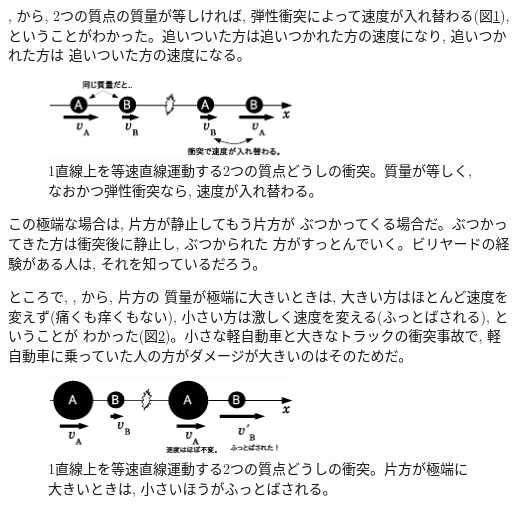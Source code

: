 , から, 
2つの質点の質量が等しければ, 弾性衝突によって速度が入れ替わる(図\ref{fig:collision24}), 
ということがわかった。追いついた方は追いつかれた方の速度になり, 追いつかれた方は
追いついた方の速度になる。
\begin{figure}[h]
    \centering
    \includegraphics[width=6.5cm]{collision24.eps}
    \caption{1直線上を等速直線運動する2つの質点どうしの衝突。質量が等しく, なおかつ弾性衝突なら, 速度が入れ替わる。}\label{fig:collision24}
\end{figure}
この極端な場合は, 片方が静止してもう片方が
ぶつかってくる場合だ。ぶつかってきた方は衝突後に静止し, ぶつかられた
方がすっとんでいく。ビリヤードの経験がある人は, それを知っているだろう。\mv

ところで, , から, 片方の
質量が極端に大きいときは, 大きい方はほとんど速度を変えず(痛くも痒くもない), 
小さい方は激しく速度を変える(ふっとばされる), ということが
わかった(図\ref{fig:collision26})。小さな軽自動車と大きなトラックの衝突事故で, 
軽自動車に乗っていた人の方がダメージが大きいのはそのためだ。

\begin{figure}[h]
    \centering
    \includegraphics[width=6.5cm]{collision26.eps}
    \caption{1直線上を等速直線運動する2つの質点どうしの衝突。片方が極端に大きいときは, 小さいほうがふっとばされる。}\label{fig:collision26}
\end{figure}

